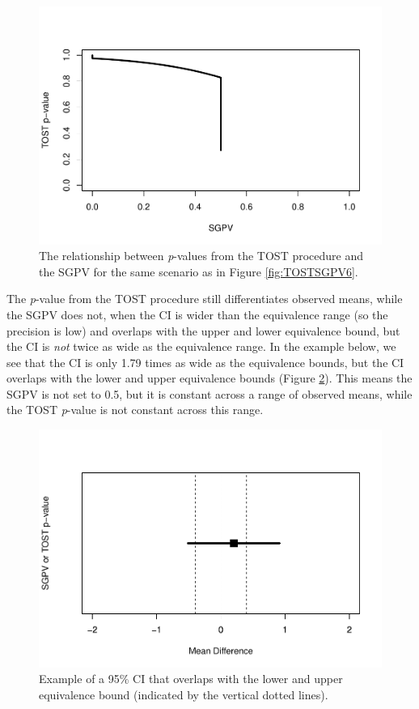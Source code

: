 \documentclass[,man,floatsintext]{apa6}
\begin{document}
\begin{figure}
\centering
\includegraphics{manuscript.R1_files/figure-latex/TOSTSGPV7-1.pdf}
\caption{\label{fig:TOSTSGPV7}The relationship between \emph{p}-values from
the TOST procedure and the SGPV for the same scenario as in Figure
\ref{fig:TOSTSGPV6}.}
\end{figure}

The \emph{p}-value from the TOST procedure still differentiates observed
means, while the SGPV does not, when the CI is wider than the
equivalence range (so the precision is low) and overlaps with the upper
and lower equivalence bound, but the CI is \emph{not} twice as wide as
the equivalence range. In the example below, we see that the CI is only
1.79 times as wide as the equivalence bounds, but the CI overlaps with
the lower and upper equivalence bounds (Figure \ref{fig:TOSTSGPV8}).
This means the SGPV is not set to 0.5, but it is constant across a range
of observed means, while the TOST \emph{p}-value is not constant across
this range.

\begin{figure}
\centering
\includegraphics{manuscript.R1_files/figure-latex/TOSTSGPV8-1.pdf}
\caption{\label{fig:TOSTSGPV8}Example of a 95\% CI that overlaps with the
lower and upper equivalence bound (indicated by the vertical dotted
lines).}
\end{figure}
\end{document}
